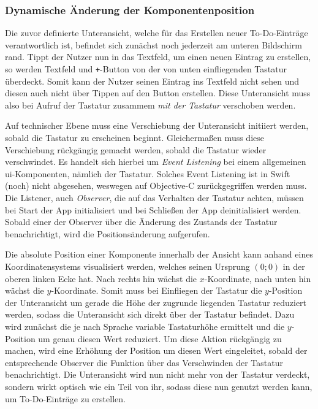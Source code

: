 \subsubsection{Dynamische Änderung der Komponentenposition}
Die zuvor definierte Unteransicht, welche für das Erstellen neuer To-Do-Einträge verantwortlich ist, befindet sich zunächst noch jederzeit am unteren Bildschirm rand. Tippt der Nutzer nun in das Textfeld, um einen neuen Eintrag zu erstellen, so werden Textfeld und \texttt{+}-Button von der von unten einfliegenden Tastatur überdeckt. Somit kann der Nutzer seinen Eintrag ins Textfeld nicht sehen und diesen auch nicht über Tippen auf den Button erstellen. Diese Unteransicht muss also bei Aufruf der Tastatur zusammem \textit{mit der Tastatur} verschoben werden.

Auf technischer Ebene muss eine Verschiebung der Unteransicht initiiert werden, sobald die Tastatur zu erscheinen beginnt. Gleichermaßen muss diese Verschiebung rückgängig gemacht werden, sobald die Tastatur wieder verschwindet. Es handelt sich hierbei um \textit{Event Listening} bei einem allgemeinen \ac{ui}-Komponenten, nämlich der Tastatur. Solches Event Listening ist in Swift (noch) nicht abgesehen, weswegen auf Objective-C zurückgegriffen werden muss. Die Listener, auch \textit{Observer}, die auf das Verhalten der Tastatur achten, müssen bei Start der App initialisiert und bei Schließen der App deinitialisiert werden. Sobald einer der Observer über die Änderung des Zustands der Tastatur benachrichtigt, wird die Positionsänderung aufgerufen.

Die absolute Position einer Komponente innerhalb der Ansicht kann anhand eines Koordinatensystems visualisiert werden, welches seinen Ursprung $(0; 0)$ in der oberen linken Ecke hat. Nach rechts hin wächst die $x$-Koordinate, nach unten hin wächst die $y$-Koordinate. Somit muss bei Einfliegen der Tastatur die $y$-Position der Unteransicht um gerade die Höhe der zugrunde liegenden Tastatur reduziert werden, sodass die Unteransicht sich direkt über der Tastatur befindet. Dazu wird zunächst die je nach Sprache variable Tastaturhöhe ermittelt und die $y$-Position um genau diesen Wert reduziert. Um diese Aktion rückgängig zu machen, wird eine Erhöhung der Position um diesen Wert eingeleitet, sobald der entsprechende Observer die Funktion über das Verschwinden der Tastatur benachrichtigt. Die Unteransicht wird nun nicht mehr von der Tastatur verdeckt, sondern wirkt optisch wie ein Teil von ihr, sodass diese nun genutzt werden kann, um To-Do-Einträge zu erstellen. \\\

